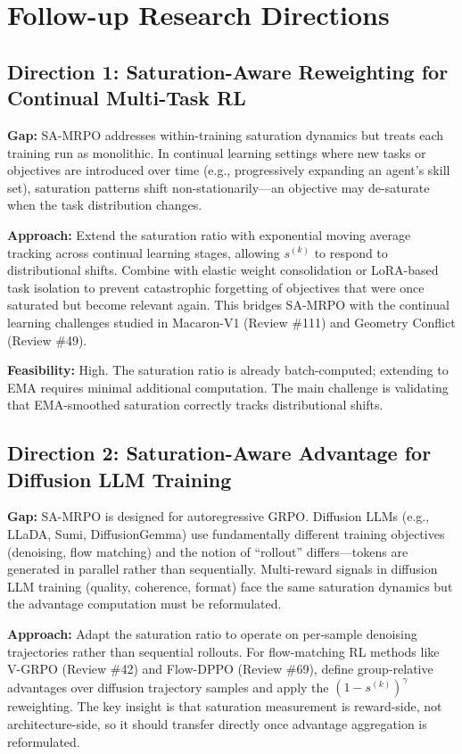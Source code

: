 \documentclass[11pt,a4paper]{article}
\begin{document}
\section{Follow-up Research Directions}

\subsection{Direction 1: Saturation-Aware Reweighting for Continual Multi-Task RL}
\textbf{Gap:} SA-MRPO addresses within-training saturation dynamics but treats each training run as monolithic. In continual learning settings where new tasks or objectives are introduced over time (e.g., progressively expanding an agent's skill set), saturation patterns shift non-stationarily---an objective may de-saturate when the task distribution changes.

\textbf{Approach:} Extend the saturation ratio with exponential moving average tracking across continual learning stages, allowing $s^{(k)}$ to respond to distributional shifts. Combine with elastic weight consolidation or LoRA-based task isolation to prevent catastrophic forgetting of objectives that were once saturated but become relevant again. This bridges SA-MRPO with the continual learning challenges studied in Macaron-V1 (Review \#111) and Geometry Conflict (Review \#49).

\textbf{Feasibility:} High. The saturation ratio is already batch-computed; extending to EMA requires minimal additional computation. The main challenge is validating that EMA-smoothed saturation correctly tracks distributional shifts.

\subsection{Direction 2: Saturation-Aware Advantage for Diffusion LLM Training}
\textbf{Gap:} SA-MRPO is designed for autoregressive GRPO. Diffusion LLMs (e.g., LLaDA, Sumi, DiffusionGemma) use fundamentally different training objectives (denoising, flow matching) and the notion of ``rollout'' differs---tokens are generated in parallel rather than sequentially. Multi-reward signals in diffusion LLM training (quality, coherence, format) face the same saturation dynamics but the advantage computation must be reformulated.

\textbf{Approach:} Adapt the saturation ratio to operate on per-sample denoising trajectories rather than sequential rollouts. For flow-matching RL methods like V-GRPO (Review \#42) and Flow-DPPO (Review \#69), define group-relative advantages over diffusion trajectory samples and apply the $(1 - s^{(k)})^\gamma$ reweighting. The key insight is that saturation measurement is reward-side, not architecture-side, so it should transfer directly once advantage aggregation is reformulated.
\end{document}
